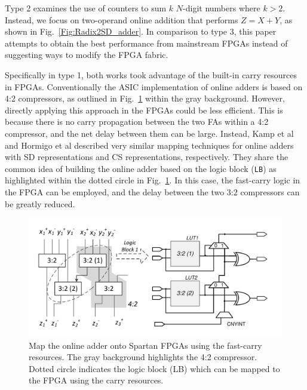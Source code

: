 \documentclass[conference]{IEEEtran}
\begin{document}
Type 2 examines the use of counters to sum $k$ $N$-digit numbers where $k>2$. Instead, we focus on two-operand online addition that performs $Z=X+Y$, as shown in Fig.~\ref{Fig:Radix2SD_adder}. In comparison to type 3, this paper attempts to obtain the best performance from mainstream FPGAs instead of suggesting ways to modify the FPGA fabric.

Specifically in type 1, both works took advantage of the built-in carry resources in FPGAs. Conventionally the ASIC implementation of online adders is based on 4:2 compressors, as outlined in Fig.~\ref{Fig:PreviousWork} within the gray background. However, directly applying this approach in the FPGAs could be less efficient. This is because there is no carry propagation between the two FAs within a 4:2 compressor, and the net delay between them can be large. Instead, Kamp et al \cite{FPT09RA} and Hormigo et al \cite{ASAP09RA} described very similar mapping techniques for online adders with SD representations and CS representations, respectively. They share the common idea of building the online adder based on the logic block (\texttt{LB}) as highlighted within the dotted circle in Fig.~\ref{Fig:PreviousWork}. In this case, the fast-carry logic in the FPGA can be employed, and the delay between the two 3:2 compressors can be greatly reduced.
%
\begin{figure}[tbp]
	\centering
	\includegraphics[width=.5\textwidth]{./Figures/SDAdder_42comp_Spartan2.pdf}
	\vspace{-3ex}
	\caption{Map the online adder onto Spartan FPGAs using the fast-carry resources. The gray background highlights the 4:2 compressor. Dotted circle indicates the logic block (LB) which can be mapped to the FPGA using the carry resources.}
	\vspace{-4ex}
	\label{Fig:PreviousWork}
\end{figure}
\end{document}

